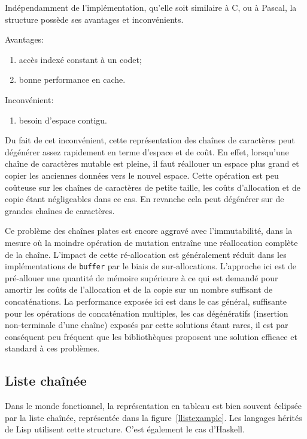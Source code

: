 Indépendamment de l'implémentation, qu'elle soit similaire à C, ou à Pascal, la structure possède
ses avantages et inconvénients.

Avantages:
\begin{enumerate}
	\item accès indexé constant à un codet;
	\item bonne performance en cache.
\end{enumerate}

Inconvénient:
\begin{enumerate}
	\item besoin d'espace contigu.
\end{enumerate}

Du fait de cet inconvénient, cette représentation des chaînes de caractères peut
dégénérer assez rapidement en terme d'espace et de coût.
En effet, lorsqu'une chaîne de caractères mutable est pleine, il faut réallouer
un espace plus grand et copier les anciennes données vers le nouvel espace.
Cette opération est peu coûteuse sur les chaînes de caractères de petite taille, les
coûts d'allocation et de copie étant négligeables dans ce cas.
En revanche cela peut dégénérer sur de grandes chaînes de caractères.

Ce problème des chaînes plates est encore aggravé avec l'immutabilité,
dans la mesure où la moindre opération de mutation entraîne une
réallocation complète de la chaîne.
L'impact de cette ré-allocation est généralement réduit dans les implémentations
de \texttt{buffer} par le biais de sur-allocations.
L'approche ici est de pré-allouer une quantité de mémoire supérieure à ce qui est
demandé pour amortir les coûts de l'allocation et de la copie sur un nombre suffisant de
concaténations.
La performance exposée ici est dans le cas général, suffisante pour les opérations
de concaténation multiples, les cas dégénératifs (insertion non-terminale d'une
chaîne) exposés par cette solutions étant rares, il est par conséquent peu fréquent
que les bibliothèques proposent une solution efficace et standard à ces problèmes.

\subsection{Liste chaînée}

Dans le monde fonctionnel, la représentation en tableau est bien souvent éclipsée
par la liste chaînée, représentée dans la figure~\ref{llistexample}.
Les langages hérités de Lisp utilisent cette structure.
C'est également le cas d'Haskell.

